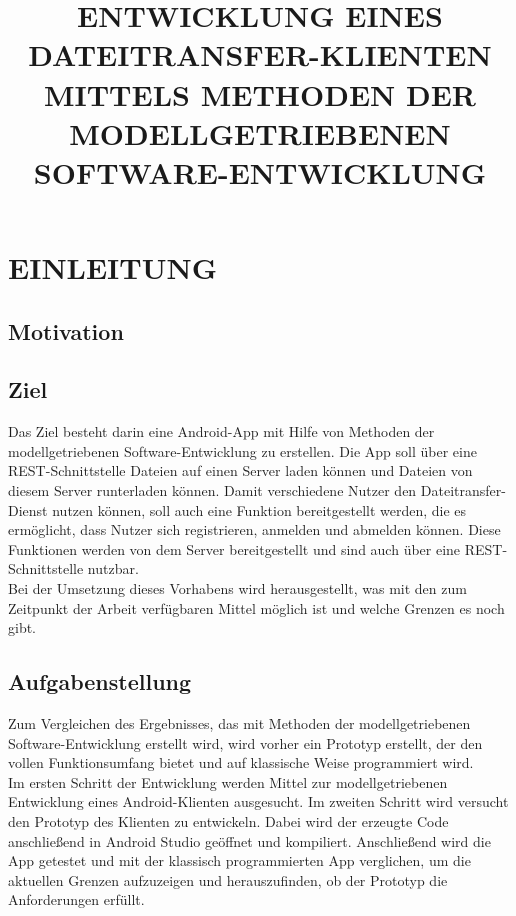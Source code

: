 \documentclass[a4paper,twoside]{article}
\begin{document}
\title{\uppercase{Entwicklung eines Dateitransfer-Klienten mittels Methoden der modellgetriebenen Software-entwicklung}}

\author{
}



\onecolumn \maketitle \normalsize \vfill

\section{\uppercase{Einleitung}}
\label{sec:introduction}

\subsection{Motivation}

\subsection{Ziel}
Das Ziel besteht darin eine Android-App mit Hilfe von Methoden der modellgetriebenen Software-Entwicklung zu erstellen. Die App soll \"uber eine REST-Schnittstelle Dateien auf einen Server
laden k\"onnen und Dateien von diesem Server runterladen k\"onnen. Damit verschiedene Nutzer den Dateitransfer-Dienst nutzen k\"onnen, soll auch eine Funktion bereitgestellt werden, die es erm\"oglicht, dass Nutzer sich registrieren, anmelden und abmelden k\"onnen. Diese Funktionen werden von dem Server bereitgestellt und sind auch \"uber eine REST-Schnittstelle nutzbar.\\
Bei der Umsetzung dieses Vorhabens wird herausgestellt, was mit den zum Zeitpunkt der Arbeit verf\"ugbaren Mittel m\"oglich ist und welche Grenzen es noch gibt.

\subsection{Aufgabenstellung}
Zum Vergleichen des Ergebnisses, das mit Methoden der modellgetriebenen Software-Entwicklung erstellt wird, wird vorher ein Prototyp erstellt, der den vollen Funktionsumfang bietet und auf klassische Weise programmiert wird.\\
Im ersten Schritt der Entwicklung werden Mittel zur modellgetriebenen Entwicklung eines Android-Klienten ausgesucht. Im zweiten Schritt wird versucht den Prototyp des Klienten zu entwickeln. Dabei wird der erzeugte Code anschließend in Android Studio ge\"offnet und kompiliert. Anschlie\ss{}end wird die App getestet und mit der klassisch programmierten App verglichen, um die aktuellen Grenzen aufzuzeigen und herauszufinden, ob der Prototyp die Anforderungen erf\"ullt.
\end{document}
